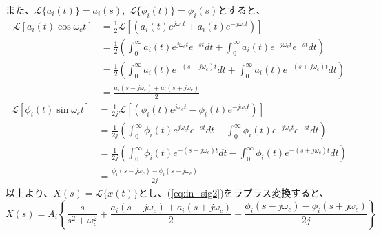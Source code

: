 \documentclass[book]{jlreq}
\begin{document}
%
また、$\mathcal{L}\{a_i(t)\} = a_i(s),\; \mathcal{L}\{\phi_i(t)\} = \phi_i(s)$とすると、
%
\begin{equation}
    \begin{split}
        \mathcal{L} [a_i(t)\cos\omega_c t] &= \frac{1}{2}\mathcal{L}[(a_i(t) e^{j\omega_c t}+a_i(t) e^{-j\omega_c t})]\\
        &= \frac{1}{2}\left(\int_0^\infty a_i(t) e^{j\omega_c t} e^{-st} dt + \int_0^\infty a_i(t) e^{-j\omega_c t} e^{-st} dt \right)\\
        &= \frac{1}{2}\left(\int_0^\infty a_i(t) e^{-(s-j\omega_c) t} dt + \int_0^\infty a_i(t) e^{-(s+j\omega_c) t} dt \right)\\
        &= \frac{a_i(s-j\omega_c) + a_i(s+j\omega_c)}{2}
    \end{split}
\end{equation}
%
\begin{equation}
    \begin{split}
        \mathcal{L} [\phi_i(t)\sin\omega_c t] &= \frac{1}{2j}\mathcal{L}[(\phi_i(t) e^{j\omega_c t} - \phi_i(t) e^{-j\omega_c t})]\\
        &= \frac{1}{2j}\left(\int_0^\infty \phi_i(t) e^{j\omega_c t} e^{-st} dt -
        \int_0^\infty \phi_i(t) e^{-j\omega_c t} e^{-st} dt \right)\\
        &= \frac{1}{2j}\left(\int_0^\infty \phi_i(t) e^{-(s-j\omega_c) t} dt -
        \int_0^\infty \phi_i(t) e^{-(s+j\omega_c) t} dt \right)\\
        &= \frac{\phi_i(s-j\omega_c) - \phi_i(s+j\omega_c)}{2j}
    \end{split}
\end{equation}
%
以上より、$X(s) = \mathcal{L}\{x(t)\}$とし、(\ref{eq:in_sig2})をラプラス変換すると、
%
\begin{equation}
    X(s) = A_i\left\{ \frac{s}{s^2+\omega_c^2}
    + \frac{a_i(s-j\omega_c) + a_i(s+j\omega_c)}{2}
    -  \frac{\phi_i(s-j\omega_c) - \phi_i(s+j\omega_c)}{2j} \right\}
\end{equation}
\end{document}

